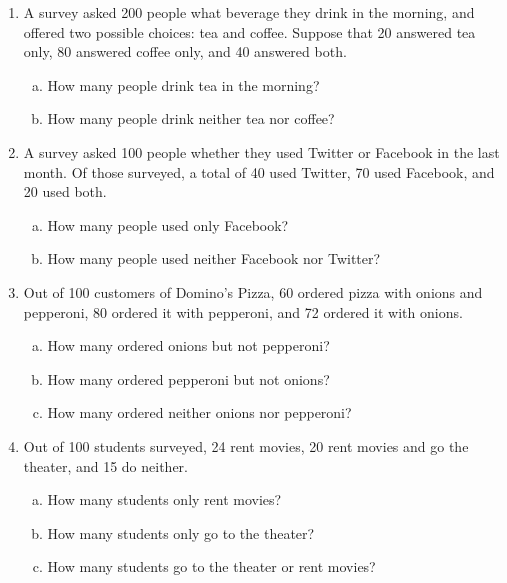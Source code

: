\begin{enumerate}
\item A survey asked 200 people what beverage they drink in the morning, and offered two possible choices: tea and coffee.  Suppose that 20 answered tea only, 80 answered coffee only, and 40 answered both.
\begin{enumerate}[(a)]
\item How many people drink tea in the morning? 
\item How many people drink neither tea nor coffee? 
\end{enumerate}

\item A survey asked 100 people whether they used Twitter or Facebook in the last month.  Of those surveyed, a total of 40 used Twitter, 70 used Facebook, and 20 used both.
\begin{enumerate}[(a)]
\item How many people used only Facebook? 
\item How many people used neither Facebook nor Twitter? 
\end{enumerate}

\item Out of 100 customers of Domino's Pizza, 60 ordered pizza with onions and pepperoni, 80 ordered it with pepperoni, and 72 ordered it with onions.
\begin{enumerate}[(a)]
\item How many ordered onions but not pepperoni? 
\item How many ordered pepperoni but not onions? 
\item How many ordered neither onions nor pepperoni? 
\end{enumerate}

\item Out of 100 students surveyed, 24 rent movies, 20 rent movies and go the theater, and 15 do neither.
\begin{enumerate}[(a)]
\item How many students only rent movies? 
\item How many students only go to the theater? 
\item How many students go to the theater or rent movies? 
\end{enumerate}


\end{enumerate}
